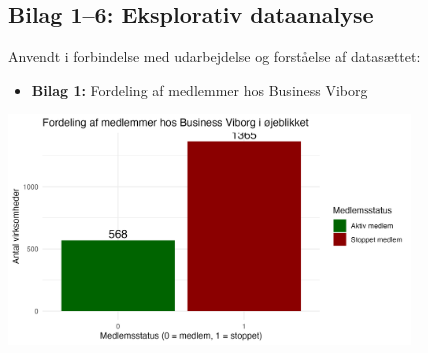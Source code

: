 \documentclass[
  11pt,
  letterpaper,
  DIV=11,
  numbers=noendperiod]{scrartcl}
\providecommand{\tightlist}{%
  \setlength{\itemsep}{0pt}\setlength{\parskip}{0pt}}\usepackage{longtable,booktabs,array}
\begin{document}
\subsection{Bilag 1--6: Eksplorativ
dataanalyse}\label{bilag-16-eksplorativ-dataanalyse}

Anvendt i forbindelse med udarbejdelse og forståelse af datasættet:

\begin{itemize}
\tightlist
\item
  \textbf{Bilag 1:} Fordeling af medlemmer hos Business Viborg
\end{itemize}

\begin{center}
\includegraphics[width=0.8\textwidth,height=\textheight]{images/EDA_1_fordeling_medlemmer.png}
\end{center}
\end{document}
